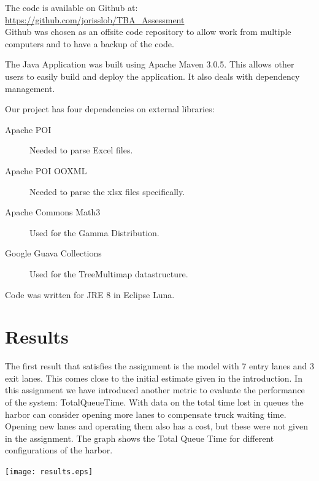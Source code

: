 \documentclass{article}
\begin{document}
The code is available on Github at:\\ 
\url{https://github.com/jorisslob/TBA_Assessment}\\ 
Github was chosen as an offsite code repository to allow work from
multiple computers and to have a backup of the code.

The Java Application was built using Apache Maven 3.0.5. This allows
other users to easily build and deploy the application. It also deals
with dependency management.

Our project has four dependencies on external libraries:

\begin{description}
\item[Apache POI] Needed to parse Excel files.
\item[Apache POI OOXML] Needed to parse the xlsx files specifically.
\item[Apache Commons Math3] Used for the Gamma Distribution.
\item[Google Guava Collections] Used for the TreeMultimap datastructure.
\end{description}

Code was written for JRE 8 in Eclipse Luna. 

\section{Results}

The first result that satisfies the assignment is the model with 7
entry lanes and 3 exit lanes. This comes close to the initial estimate
given in the introduction. In this assignment we have introduced
another metric to evaluate the performance of the system:
TotalQueueTime. With data on the total time lost in queues the harbor
can consider opening more lanes to compensate truck waiting
time. Opening new lanes and operating them also has a cost, but these
were not given in the assignment. The graph shows the Total Queue Time
for different configurations of the harbor.

\texttt{[image: results.eps]}
\end{document}
